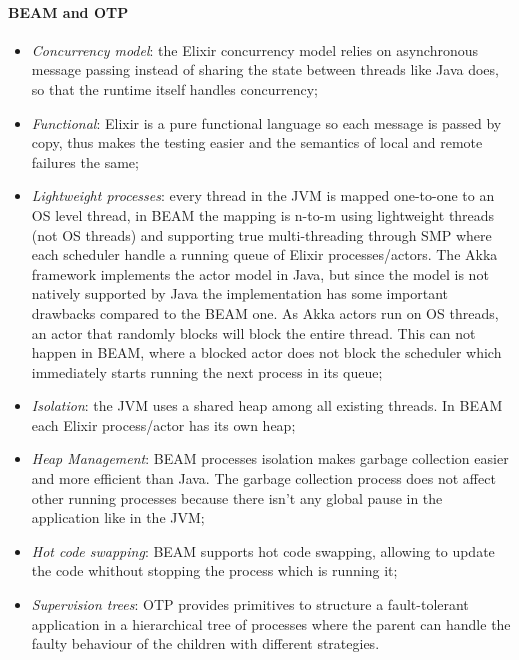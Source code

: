 \paragraph{BEAM and OTP}
\begin{itemize}
    \item \textit{Concurrency model}: the Elixir concurrency model relies on 
asynchronous message passing instead of sharing the state between threads 
like Java does, so that the runtime itself handles concurrency;
   \item \textit{Functional}: Elixir is a pure functional language 
so each message is passed by copy, thus makes the testing easier and the 
semantics of local and remote failures the same; 
    \item \textit{Lightweight processes}: every thread in the JVM is mapped 
one-to-one to an OS level thread, in BEAM the mapping is n-to-m using 
lightweight threads (not OS threads) and supporting true multi-threading 
through SMP where each scheduler handle a running queue of Elixir 
processes/actors. The Akka framework implements the actor model in Java, but 
since the model is not natively supported by Java the implementation 
has some important drawbacks compared to the BEAM one. As Akka actors run on 
OS threads, an actor that randomly blocks will block the entire thread. This can
 not happen in BEAM, where a blocked actor does not block the scheduler which
immediately starts running the next process in its queue;  
    \item \textit{Isolation}: the JVM uses a shared heap among all existing 
threads. In BEAM each Elixir process/actor has its own heap;
    \item \textit{Heap Management}: BEAM processes isolation makes garbage 
collection easier and more efficient than Java. The garbage collection process 
does not affect other running processes because there isn't any global pause 
in the application like in the JVM;
    \item \textit{Hot code swapping}: BEAM supports hot code swapping, allowing 
to update the code whithout stopping the process which is running it;
    \item \textit{Supervision trees}: OTP provides primitives to structure a 
fault-tolerant application in a hierarchical tree of processes where the parent 
can handle the faulty behaviour of the children with different strategies.
\end{itemize}
